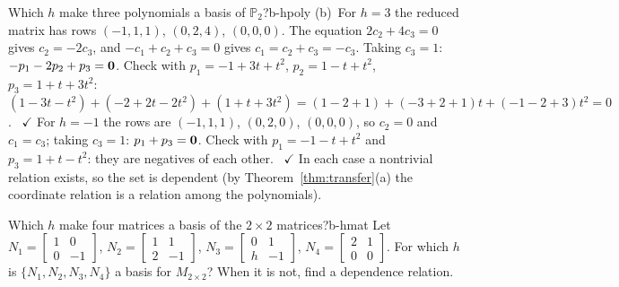 \documentclass[11pt]{article}
\begin{document}
\begin{exmp}{Which $h$ make three polynomials a basis of $\mathbb P_2$?}{b-hpoly}
(b)~For $h=3$ the reduced matrix has rows $(-1,1,1)$, $(0,2,4)$, $(0,0,0)$. The equation $2c_2+4c_3=0$ gives $c_2=-2c_3$, and $-c_1+c_2+c_3=0$ gives $c_1=c_2+c_3=-c_3$. Taking $c_3=1$: $-p_1-2p_2+p_3=\mathbf{0}$. Check with $p_1=-1+3t+t^2$, $p_2=1-t+t^2$, $p_3=1+t+3t^2$: $(1-3t-t^2)+(-2+2t-2t^2)+(1+t+3t^2)=(1-2+1)+(-3+2+1)t+(-1-2+3)t^2=0$. \ $\checkmark$ For $h=-1$ the rows are $(-1,1,1)$, $(0,2,0)$, $(0,0,0)$, so $c_2=0$ and $c_1=c_3$; taking $c_3=1$: $p_1+p_3=\mathbf{0}$. Check with $p_1=-1-t+t^2$ and $p_3=1+t-t^2$: they are negatives of each other. \ $\checkmark$ In each case a nontrivial relation exists, so the set is dependent (by Theorem~\ref{thm:transfer}(a) the coordinate relation is a relation among the polynomials).
\end{exmp}

\begin{exmp}{Which $h$ make four matrices a basis of the $2\times2$ matrices?}{b-hmat}
Let $N_1=\begin{bmatrix}1&0\\0&-1\end{bmatrix}$, $N_2=\begin{bmatrix}1&1\\2&-1\end{bmatrix}$, $N_3=\begin{bmatrix}0&1\\h&-1\end{bmatrix}$, $N_4=\begin{bmatrix}2&1\\0&0\end{bmatrix}$. For which $h$ is $\{N_1,N_2,N_3,N_4\}$ a basis for $M_{2\times2}$? When it is not, find a dependence relation.


\end{exmp}
\end{document}
